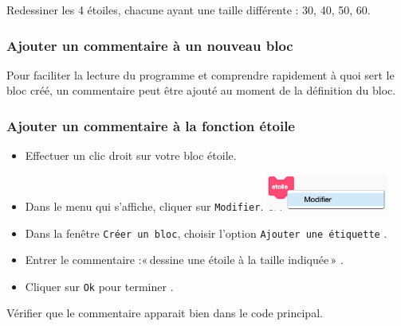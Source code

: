 
\vspace{12pt}

Redessiner les 4 étoiles, chacune ayant une taille différente : 30, 40, 50, 60.

\vspace{12pt}

\subsubsection{Ajouter un commentaire à un nouveau bloc}

Pour faciliter la lecture du programme et comprendre rapidement à quoi sert le bloc créé, un commentaire peut être ajouté au moment de la définition du bloc.

\subsubsection{Ajouter un commentaire à la fonction étoile}

\begin{itemize}
\item Effectuer un clic droit sur votre bloc étoile.
\item Dans le menu qui s’affiche, cliquer sur \texttt{Modifier}.
\includegraphics[width=4cm]{./images/scratch03/fonction/modifierBloc.png} 
\item Dans la fenêtre \texttt{Créer un bloc}, choisir l'option \texttt{Ajouter une étiquette} .
\item Entrer le commentaire :«\,dessine une étoile à la taille indiquée\,» .
\item Cliquer sur \texttt{Ok} pour terminer .
\end{itemize}




Vérifier que le commentaire apparait bien dans le code principal.

